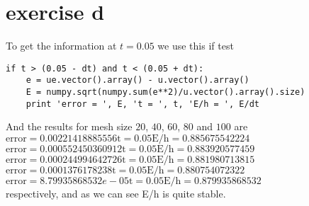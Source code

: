 \section{exercise d}

To get the information at $t = 0.05$ we use this if test

\begin{lstlisting}
if t > (0.05 - dt) and t < (0.05 + dt):
    e = ue.vector().array() - u.vector().array()
    E = numpy.sqrt(numpy.sum(e**2)/u.vector().array().size)
    print 'error = ', E, 't = ', t, 'E/h = ', E/dt
\end{lstlisting}

And the results for mesh size $20$, $40$, $60$, $80$ and $100$ are\\

$\text{error} =  0.00221418885556 \text{t} =  0.05 \text{E/h} =  0.885675542224$\\
$\text{error} =  0.000552450360912 \text{t} =  0.05 \text{E/h} =  0.883920577459$\\
$\text{error} =  0.000244994642726 \text{t} =  0.05 \text{E/h} =  0.881980713815$\\
$\text{error} =  0.0001376178238 \text{t} =  0.05 \text{E/h} =  0.880754072322$\\
$\text{error} = 8.79935868532e-05 \text{t} = 0.05 \text{E/h} = 0.879935868532$\\

respectively, and as we can see E/h is quite stable.

